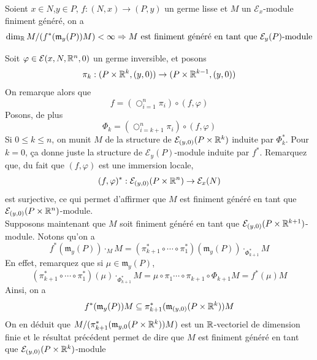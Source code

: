 \documentclass[memoire.tex]{subfiles}
\begin{document}
\begin{lemme}
    Soient $x\in N$,$y\in P$, $f:(N,x)\rightarrow (P,y)$ un germe  lisse  et $M$ un $\mathcal{E}_x$-module finiment généré, on a 
\begin{equation*}
    \dim_{\mathbb{R}} M/(f^{*}(\mathfrak{m}_y(P))M)< 
    \infty\Rightarrow M \text{ est finiment généré en tant que $\mathcal{E}_y(P)$-module}
\end{equation*}
\end{lemme}
\begin{preuve}
    Soit $\varphi\in\mathcal{E}(x,N,\mathbb{R}^n,0)$ un germe  inversible, et posons 
    \begin{equation*}
        \pi_k: (P\times\mathbb{R}^k,(y,0))\rightarrow (P\times\mathbb{R}^{k-1},(y,0))
    \end{equation*}
    On remarque alors que 
    \begin{equation*}
        f=\left(\bigcirc_{i=1}^n\pi_i\right)\circ(f,\varphi)
    \end{equation*}
    Posons, de plus
    \begin{equation*}
        \Phi_k =\left(\bigcirc_{i=k+1}^n\pi_i\right)\circ(f,\varphi)
    \end{equation*}
    Si $0\leq k\leq n$, on munit $M$ de la structure de 
    $\mathcal{E}_{(y,0)}(P\times \mathbb{R}^k)$ induite par 
    $\Phi^{*}_k$. Pour $k=0$, ça donne juste la structure de  $\mathcal{E}_{y}(P)$-module induite par $f^{*}$. Remarquez que, du fait que $(f,\varphi)$ est une immersion locale,
    \begin{equation*}
        (f,\varphi)^*:\mathcal{E}_{(y,0)}(P\times\mathbb{R}^n)\rightarrow \mathcal{E}_{x}(N)
    \end{equation*}
    est surjective, ce qui permet d'affirmer que $M$ est finiment généré en tant que $\mathcal{E}_{(y,0)}(P\times\mathbb{R}^n)$-module.\\
    Supposons maintenant que $M$ soit finiment généré en tant que $\mathcal{E}_{(y,0)}(P\times\mathbb{R}^{k+1})$-module. Notons qu'on a 
    \begin{equation}\label{equation1}
        f^*(\mathfrak{m}_y(P))\cdot_{M}M=(\pi^{*}_{k+1}\circ\cdots \circ \pi^{*}_1)(\mathfrak{m}_y(P))\cdot_{\Phi_{k+1}^*}M
    \end{equation}
    En effet, remarquez que si $\mu\in\mathfrak{m}_y(P)$, 
    \begin{equation*}
        (\pi^{*}_{k+1}\circ\cdots \circ 
        \pi^{*}_1)(\mu)\cdot_{\Phi_{k+1}
        ^*}M=\mu\circ\pi_1\cdots\circ \pi_{k
        +1}\circ \Phi_{k+1} M=f^*(\mu)M
    \end{equation*}
    Ainsi, on a 
    \begin{equation*}
        f^*(\mathfrak{m}_y(P))M\subseteq 
        \pi^*_{k+1}(\mathfrak{m}_{(y,0)}
        (P\times \mathbb{R}^k))M
    \end{equation*}
    On en déduit que $M/(\pi_{k+1}^*
    (\mathfrak{m}_{y,0}(P\times \mathbb{R}^k))M)$ 
    est un $\mathbb{R}$-vectoriel de dimension 
    finie et le résultat précédent permet de dire que $M$ est finiment généré en tant que $\mathcal{E}_{(y,0)}(P\times\mathbb{R}^k)$-module
\end{preuve}
\end{document}
